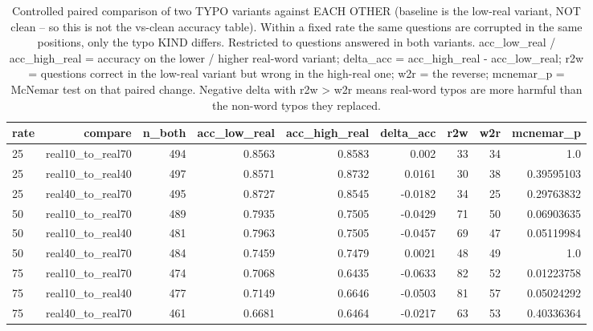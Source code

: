 \documentclass[11pt]{article}
\begin{document}
\begin{table}[H]
\centering
\caption{Controlled paired comparison of two TYPO variants against EACH OTHER (baseline is the low-real variant, NOT clean -- so this is not the vs-clean accuracy table). Within a fixed rate the same questions are corrupted in the same positions, only the typo KIND differs. Restricted to questions answered in both variants. acc\_low\_real / acc\_high\_real = accuracy on the lower / higher real-word variant; delta\_acc = acc\_high\_real - acc\_low\_real; r2w = questions correct in the low-real variant but wrong in the high-real one; w2r = the reverse; mcnemar\_p = McNemar test on that paired change. Negative delta with r2w > w2r means real-word typos are more harmful than the non-word typos they replaced.}
\small
\begin{adjustbox}{max width=\textwidth}
\begin{tabular}{lrrrrrrrr}
\toprule
\textbf{rate} & \textbf{compare} & \textbf{n\_both} & \textbf{acc\_low\_real} & \textbf{acc\_high\_real} & \textbf{delta\_acc} & \textbf{r2w} & \textbf{w2r} & \textbf{mcnemar\_p} \\
\midrule
25 & real10\_to\_real70 & 494 & 0.8563 & 0.8583 & 0.002 & 33 & 34 & 1.0 \\
25 & real10\_to\_real40 & 497 & 0.8571 & 0.8732 & 0.0161 & 30 & 38 & 0.39595103 \\
25 & real40\_to\_real70 & 495 & 0.8727 & 0.8545 & -0.0182 & 34 & 25 & 0.29763832 \\
50 & real10\_to\_real70 & 489 & 0.7935 & 0.7505 & -0.0429 & 71 & 50 & 0.06903635 \\
50 & real10\_to\_real40 & 481 & 0.7963 & 0.7505 & -0.0457 & 69 & 47 & 0.05119984 \\
50 & real40\_to\_real70 & 484 & 0.7459 & 0.7479 & 0.0021 & 48 & 49 & 1.0 \\
75 & real10\_to\_real70 & 474 & 0.7068 & 0.6435 & -0.0633 & 82 & 52 & 0.01223758 \\
75 & real10\_to\_real40 & 477 & 0.7149 & 0.6646 & -0.0503 & 81 & 57 & 0.05024292 \\
75 & real40\_to\_real70 & 461 & 0.6681 & 0.6464 & -0.0217 & 63 & 53 & 0.40336364 \\
\bottomrule
\end{tabular}
\end{adjustbox}
\end{table}
\end{document}
